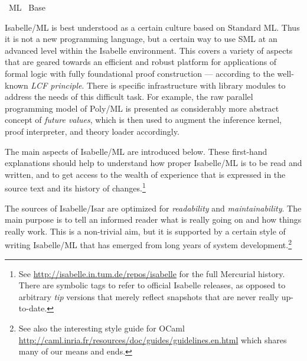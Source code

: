 %
\begin{isabellebody}%
\def\isabellecontext{ML}%
%
\isadelimtheory
%
\endisadelimtheory
%
\isatagtheory
{}\isamarkupfalse%
\ {\isachardoublequoteopen}ML{\isachardoublequoteclose}\isanewline
{}\ Base\isanewline
{}%
\endisatagtheory
{\isafoldtheory}%
%
\isadelimtheory
%
\endisadelimtheory
%
\isamarkuptrue%
%
\begin{isamarkuptext}%
Isabelle/ML is best understood as a certain culture based on
  Standard ML.  Thus it is not a new programming language, but a
  certain way to use SML at an advanced level within the Isabelle
  environment.  This covers a variety of aspects that are geared
  towards an efficient and robust platform for applications of formal
  logic with fully foundational proof construction --- according to
  the well-known \emph{LCF principle}.  There is specific
  infrastructure with library modules to address the needs of this
  difficult task.  For example, the raw parallel programming model of
  Poly/ML is presented as considerably more abstract concept of
  \emph{future values}, which is then used to augment the inference
  kernel, proof interpreter, and theory loader accordingly.

  The main aspects of Isabelle/ML are introduced below.  These
  first-hand explanations should help to understand how proper
  Isabelle/ML is to be read and written, and to get access to the
  wealth of experience that is expressed in the source text and its
  history of changes.\footnote{See
  \url{http://isabelle.in.tum.de/repos/isabelle} for the full
  Mercurial history.  There are symbolic tags to refer to official
  Isabelle releases, as opposed to arbitrary \emph{tip} versions that
  merely reflect snapshots that are never really up-to-date.}%
\end{isamarkuptext}%
\isamarkuptrue%
%
\isamarkuptrue%
%
\begin{isamarkuptext}%
The sources of Isabelle/Isar are optimized for
  \emph{readability} and \emph{maintainability}.  The main purpose is
  to tell an informed reader what is really going on and how things
  really work.  This is a non-trivial aim, but it is supported by a
  certain style of writing Isabelle/ML that has emerged from long
  years of system development.\footnote{See also the interesting style
  guide for OCaml
  \url{http://caml.inria.fr/resources/doc/guides/guidelines.en.html}
  which shares many of our means and ends.}


\end{isamarkuptext}
\end{isabellebody}

